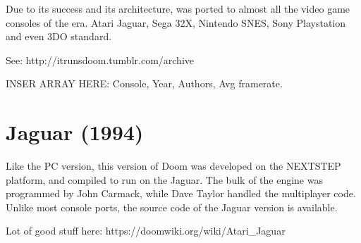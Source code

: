 Due to its success and its architecture, \doom was ported to almost all the video game consoles of the era. Atari Jaguar, Sega 32X, Nintendo SNES, Sony Playstation and even 3DO standard.\\
\par
{}
\par
See: http://itrunsdoom.tumblr.com/archive\\
\par
INSER ARRAY HERE: Console, Year, Authors, Avg framerate.











\section{Jaguar (1994)}
Like the PC version, this version of Doom was developed on the NEXTSTEP platform, and compiled to run on the Jaguar. The bulk of the engine was programmed by John Carmack, while Dave Taylor handled the multiplayer code. Unlike most console ports, the source code of the Jaguar version is available.\\
\par
{}
\par
Lot of good stuff here: https://doomwiki.org/wiki/Atari\_Jaguar\\
\par
{}










